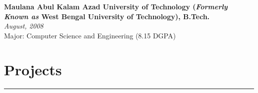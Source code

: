 \documentclass[10pt, a4paper]{article}
\begin{document}
   
    \vspace*{-2mm}
    
    \noindent
    \textbf{Maulana Abul Kalam Azad University of Technology (\textit{Formerly Known as} West Bengal University of Technology), B.Tech.}\\
    \textit{August, 2008}\\
    Major: Computer Science and Engineering (8.15 DGPA)\\
    
    
    \vspace*{-7mm}	
       		
    \section*{Projects}
    \vspace*{-2.5mm}
    \hrule 
    \vspace*{2mm}
\end{document}
